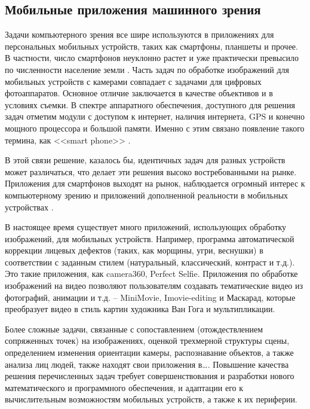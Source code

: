 
\subsection{Мобильные приложения машинного зрения}

Задачи компьютерного зрения все шире используются в приложениях для персональных мобильных устройств, таких как смартфоны, планшеты и прочее. В частности, число смартфонов неуклонно растет и уже практически превысило по численности население земли \cite{Battiato2012}. Часть задач по обработке изображений для мобильных устройств с камерами совпадает с задачами для цифровых фотоаппаратов. Основное отличие заключается в качестве объективов и в условиях съемки. В спектре аппаратного обеспечения, доступного для решения задач отметим модули с доступом к интернет, наличия интернета, GPS и конечно мощного процессора и большой памяти. Именно с этим связано появление такого термина, как <<smart phone>> \cite{Hannuksela2007}.

В этой связи решение, казалось бы, идентичных задач для разных устройств может различаться, что делает эти решения высоко востребованными на рынке. Приложения для смартфонов выходят на рынок, наблюдается огромный интерес к компьютерному зрению и приложений дополненной реальности в мобильных устройствах \cite{Shubina2010}.

В настоящее время существует много приложений, использующих обработку изображений, для мобильных устройств. Например, программа автоматической коррекции лицевых дефектов (таких, как морщины, угри, веснушки) в соответствии с заданным стилем (натуральный, классический, контраст и т.д.). Это такие приложения, как camera360, Perfect Selfie. Приложения по обработке изображений на видео позволяют пользователям создавать тематические видео из фотографий, анимации и т.д. -- MiniMovie, Imovie-editing и Маскарад, которые преобразует видео в стиль картин художника Ван Гога и мультипликации.

Более сложные задачи, связанные с сопоставлением (отождествлением сопряженных точек) на изображениях, оценкой трехмерной структуры сцены, определением изменения ориентации камеры, распознавание объектов, а также анализа лиц людей, также находят свои приложения в\ldots{}. Повышение качества решения перечисленных задач требует совершенствования и разработки нового математического и программного обеспечения, и адаптации его к вычислительным возможностям мобильных устройств, а также к их периферии.

